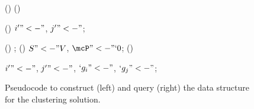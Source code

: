\begin{figure}
	{%
		\setlength{\algomargin}{0.4em}
		\noindent\begin{minipage}[t]{.45\linewidth}
			\begin{algorithm}[H]
				\myfn(\label{ln:initialize}){\initialize{}}{
            	}
            	\BlankLine
				\myfn(\label{ln:find}){}{

				}
				\BlankLine
				\myfn(\label{ln:merge}){}{
					$i'"<-"$,
					$j'"<-"$;\;
				}
			\end{algorithm}
		\end{minipage}
		\begin{minipage}[t]{.45\linewidth}
			\begin{algorithm}[H]
				\myfn(\label{ln:getCriticalValues}){\getCriticalValues{}}{
					\KwRet {};\;
				}
				\BlankLine
				\myfn(\label{ln:getPartition}){}{
					$S"<-"V$, $\mcP"<-"`0$;\;
				}
				\BlankLine
				\vspace{.4em}
				\myfn(\label{ln:similarity}){}{
					$i'"<-"$,
					$j'"<-"$,
					$`g_i"<-"$,
					$`g_j"<-"$;\;

				}
			\end{algorithm}
		\end{minipage}
	}
	\caption{Pseudocode to construct (left) and query (right) the data structure for the clustering solution.}
	\label{fig:data_structure}
\end{figure}

